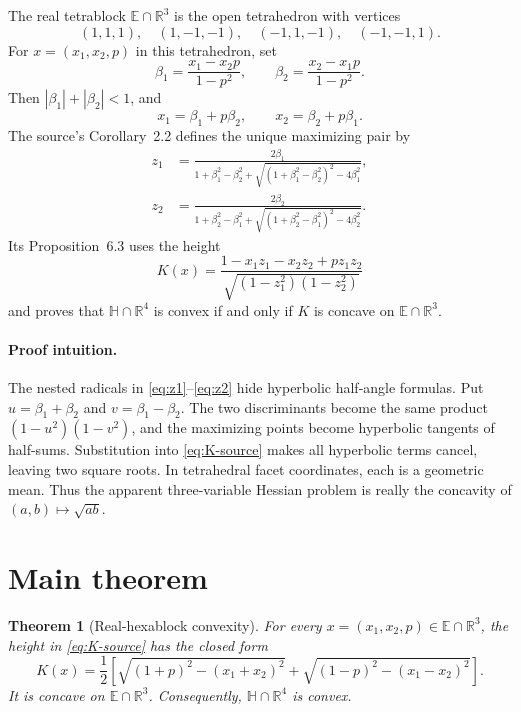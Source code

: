 \documentclass[11pt]{article}
\newtheorem{theorem}{Theorem}
\newcommand{\E}{\mathbb E}
\newcommand{\HH}{\mathbb H}
\newcommand{\R}{\mathbb R}
\begin{document}
The real tetrablock \(\E\cap\R^3\) is the open tetrahedron with vertices
\[
 (1,1,1),\quad (1,-1,-1),\quad (-1,1,-1),\quad (-1,-1,1).
\]
For \(x=(x_1,x_2,p)\) in this tetrahedron, set
\[
 \beta_1=\frac{x_1-x_2p}{1-p^2},\qquad
 \beta_2=\frac{x_2-x_1p}{1-p^2}.
\]
Then \(|\beta_1|+|\beta_2|<1\), and
\begin{equation}\label{eq:x-beta}
 x_1=\beta_1+p\beta_2,\qquad
 x_2=\beta_2+p\beta_1.
\end{equation}
The source's Corollary~2.2 defines the unique maximizing pair by
\begin{align}
 z_1&=\frac{2\beta_1}{1+\beta_1^2-\beta_2^2+
 \sqrt{(1+\beta_1^2-\beta_2^2)^2-4\beta_1^2}},\label{eq:z1}\\
 z_2&=\frac{2\beta_2}{1+\beta_2^2-\beta_1^2+
 \sqrt{(1+\beta_2^2-\beta_1^2)^2-4\beta_2^2}}.\label{eq:z2}
\end{align}
Its Proposition~6.3 uses the height
\begin{equation}\label{eq:K-source}
 K(x)=\frac{1-x_1z_1-x_2z_2+pz_1z_2}
 {\sqrt{(1-z_1^2)(1-z_2^2)}}
\end{equation}
and proves that \(\HH\cap\R^4\) is convex if and only if \(K\) is
concave on \(\E\cap\R^3\).

\paragraph{Proof intuition.}
The nested radicals in \eqref{eq:z1}--\eqref{eq:z2} hide hyperbolic
half-angle formulas.  Put \(u=\beta_1+\beta_2\) and
\(v=\beta_1-\beta_2\).  The two discriminants become the same product
\((1-u^2)(1-v^2)\), and the maximizing points become hyperbolic tangents of
half-sums.  Substitution into \eqref{eq:K-source} makes all hyperbolic
terms cancel, leaving two square roots.  In tetrahedral facet coordinates,
each is a geometric mean.  Thus the apparent three-variable Hessian problem
is really the concavity of \((a,b)\mapsto\sqrt{ab}\).

\section{Main theorem}

\begin{theorem}[Real-hexablock convexity]\label{thm:main}
For every \(x=(x_1,x_2,p)\in\E\cap\R^3\), the height in
\eqref{eq:K-source} has the closed form
\begin{equation}\label{eq:closed}
 K(x)=\frac12\left[
 \sqrt{(1+p)^2-(x_1+x_2)^2}
 +\sqrt{(1-p)^2-(x_1-x_2)^2}\right].
\end{equation}
It is concave on \(\E\cap\R^3\).  Consequently,
\(\HH\cap\R^4\) is convex.
\end{theorem}
\end{document}
